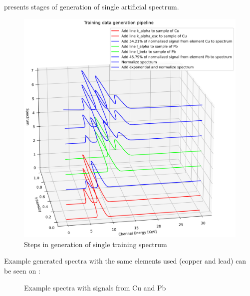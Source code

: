  presents stages of generation of single artificial spectrum. 
\begin{figure}[H] 
  \centering     
  \includegraphics[width=1\textwidth]{img/training_data_generation_pipeline.png} 
  \caption{Steps in generation of single training spectrum}
  \label{fig:training_data_generation}
\end{figure}

Example generated spectra with the same elements used (copper and lead) can be seen on :

\begin{figure}[H] 
  \centering     
   
  \caption{Example spectra with signals from Cu and Pb}
  \label{fig:sum-spectras}
\end{figure}


